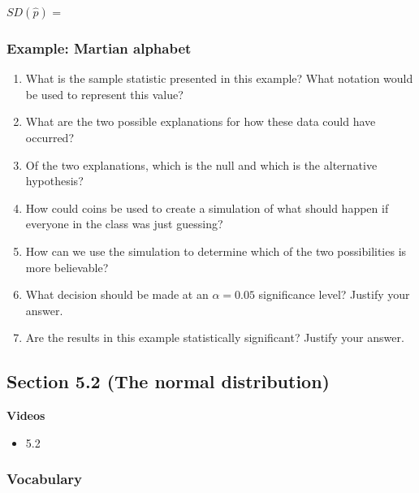 \documentclass[
]{report}
\providecommand{\tightlist}{%
  \setlength{\itemsep}{0pt}\setlength{\parskip}{0pt}}
\newcommand{\rgs}{\vspace{12pt}} %
\begin{document}
\(SD(\hat{p})\) =
\rgs

\hypertarget{example-martian-alphabet}{%
\subsubsection*{Example: Martian alphabet}\label{example-martian-alphabet}}

\begin{enumerate}
\def\labelenumi{\arabic{enumi}.}
\item
  What is the sample statistic presented in this example? What notation would be used to represent this value?
  \rgs
\item
  What are the two possible explanations for how these data could have occurred?
  \rgs
\item
  Of the two explanations, which is the null and which is the alternative hypothesis?
  \rgs
\item
  How could coins be used to create a simulation of what should happen if everyone in the class was just guessing?
  \rgs
  \rgs
\item
  How can we use the simulation to determine which of the two possibilities is more believable?
  \rgs
  \rgs
\item
  What decision should be made at an \(\alpha = 0.05\) significance level? Justify your answer.
  \rgs
\item
  Are the results in this example statistically significant? Justify your answer.
  \rgs
\end{enumerate}

\hypertarget{section-5.2-the-normal-distribution}{%
\subsection*{Section 5.2 (The normal distribution)}\label{section-5.2-the-normal-distribution}}


\textbf{Videos}

\begin{itemize}
\tightlist
\item
  5.2
\end{itemize}


\hypertarget{vocabulary-11}{%
\subsubsection*{Vocabulary}\label{vocabulary-11}}
\end{document}

